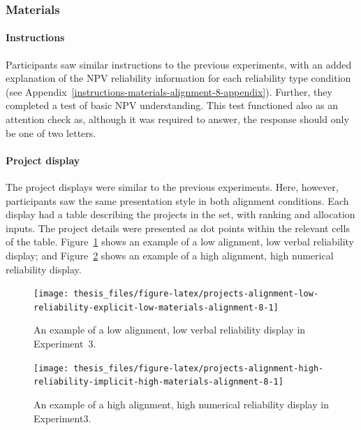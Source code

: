 \documentclass[a4paper, nobind, dvipsnames]{templates/ociamthesis}
\theoremstyle{definition}
\theoremstyle{definition}
\theoremstyle{definition}
\theoremstyle{definition}
\theoremstyle{remark}
\begin{document}
\subsubsection{Materials}

\paragraph{Instructions}

Participants saw similar instructions to the previous experiments, with an added
explanation of the NPV reliability information for each reliability type
condition (see Appendix~\ref{instructions-materials-alignment-8-appendix}).
Further, they completed a test of basic NPV understanding. This test functioned
also as an attention check as, although it was required to answer, the response
should only be one of two letters.

\paragraph{Project display}

The project displays were similar to the previous experiments. Here, however,
participants saw the same presentation style in both alignment conditions. Each
display had a table describing the projects in the set, with ranking and
allocation inputs. The project details were presented as dot points within the
relevant cells of the table.
Figure~\ref{fig:projects-alignment-low-reliability-explicit-low-materials-alignment-8}
shows an example of a low alignment, low verbal reliability display; and
Figure~\ref{fig:projects-alignment-high-reliability-implicit-high-materials-alignment-8}
shows an example of a high alignment, high numerical reliability display.



\begin{figure}
\texttt{[image: thesis\_files/figure-latex/projects-alignment-low-reliability-explicit-low-materials-alignment-8-1]} \caption{An example of a low alignment, low verbal reliability display in Experiment~3.}\label{fig:projects-alignment-low-reliability-explicit-low-materials-alignment-8}
\end{figure}



\begin{figure}
\texttt{[image: thesis\_files/figure-latex/projects-alignment-high-reliability-implicit-high-materials-alignment-8-1]} \caption{An example of a high alignment, high numerical reliability display in Experiment3.}\label{fig:projects-alignment-high-reliability-implicit-high-materials-alignment-8}
\end{figure}
\end{document}
